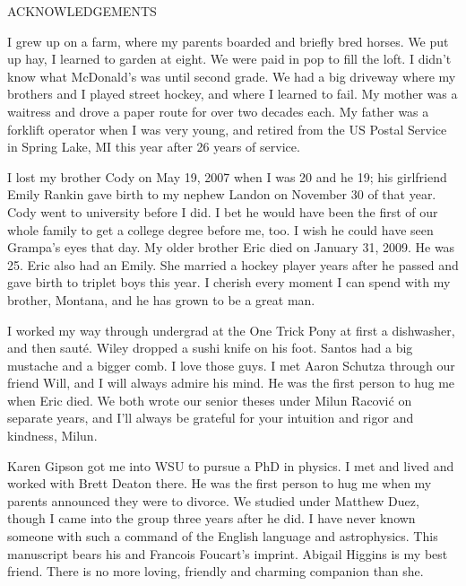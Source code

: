 \label{chap:acknowledgements}

\begin{center}
  \uppercase{Acknowledgements}
\end{center}

\bigskip


I grew up on a farm, where my parents boarded and briefly bred horses. 
We put up hay, I learned to garden at eight.  We were paid in pop to fill the loft. 
I didn't know what McDonald's was until second grade.
We had a big driveway where my brothers and I played street hockey, and where I learned to fail.
My mother was a waitress and drove a paper route for over two decades each.
My father was a forklift operator when I was very young, and retired from the US Postal Service in Spring Lake, MI this year after 26 years of service.
 
I lost my brother Cody on May 19, 2007 when I was 20 and he 19;
his girlfriend Emily Rankin gave birth to my nephew Landon on November 30 of that year.
Cody went to university before I did.
I bet he would have been the first of our whole family to get a college degree before me, too.
I wish he could have seen Grampa's eyes that day.
My older brother Eric died on January 31, 2009. 
He was 25.
Eric also had an Emily.  
She married a hockey player years after he passed and gave birth to triplet boys this year.
I cherish every moment I can spend with my brother, Montana, and he has grown to be a great man.

I worked my way through undergrad at the One Trick Pony at first a dishwasher, and then saut\'e.  
Wiley dropped a sushi knife on his foot.  Santos had a big mustache and a bigger comb.  I love those guys.
I met Aaron Schutza through our friend Will, and I will always admire his mind.  He was the first person to hug me when Eric died.
We both wrote our senior theses under Milun Racovi\'c on separate years, and I'll always be grateful for your intuition and rigor and kindness, Milun.

Karen Gipson got me into WSU to pursue a PhD in physics.  I met and lived and worked with Brett Deaton there.  
He was the first person to hug me when my parents announced they were to divorce.  
We studied under Matthew Duez, though I came into the group three years after he did.
I have never known someone with such a command of the English language and astrophysics.  This manuscript bears his and Francois Foucart's imprint.
Abigail Higgins is my best friend.
There is no more loving, friendly and charming companion than she.





\newpage